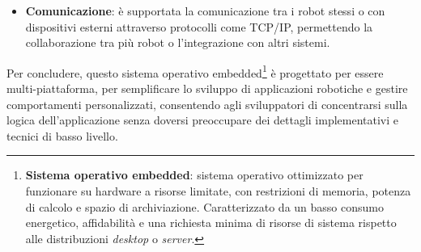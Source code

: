 \begin{sloppypar}
{\begin{itemize}
come il riconoscimento facciale e il riconoscimento degli oggetti, che consentono
ai robot di interagire con gli esseri umani e di analizzare l’ambiente
circostante.
\vspace{0.4cm}
     \item \textbf{Comunicazione}: è supportata la comunicazione tra i robot stessi
o con dispositivi esterni attraverso protocolli come TCP/IP, permettendo
la collaborazione tra più robot o l’integrazione con altri sistemi.
 \end{itemize}
\vspace{1.5cm}
Per concludere, questo sistema operativo embedded\footnote{\textbf{Sistema operativo embedded}: sistema operativo ottimizzato per funzionare su hardware a risorse limitate, con restrizioni di memoria, potenza di calcolo e spazio di archiviazione. Caratterizzato da un basso consumo energetico, affidabilità e una richiesta minima di risorse di sistema rispetto alle distribuzioni \textit{desktop} o \textit{server}.} è progettato per essere multi-piattaforma, per semplificare lo sviluppo di applicazioni robotiche e gestire
comportamenti personalizzati, consentendo agli sviluppatori di concentrarsi
sulla logica dell’applicazione senza doversi preoccupare dei dettagli implementativi
e tecnici di basso livello.
}
\newpage
\end{sloppypar}
\afterpage{\blankpage}